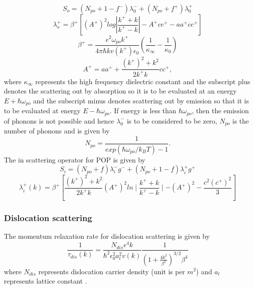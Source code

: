 \documentclass[12pt]{article}
\begin{document}
\begin{equation}
S_{o} = ( N_{po} + 1 - \textit{f}^- ) \lambda^{-}_0 + ( N_{po} + \textit{f}^+) \lambda^{+}_0 
\label{So}
\end{equation}
\begin{equation}
\lambda^+_{o} = \beta^+[(A^+)^2 log \left| \frac{k^+ + k}{k^+ - k}\right| - A^+ c c^+ - aa^+cc^+] 
\label{lambda0}
\end{equation}
\begin{equation}
\beta^+ = \frac{e^2 \omega_{po} k^+ }{4 \pi \hbar k v(k^+) \epsilon_0 } \left(\frac{1}{\kappa_\infty} - \frac{1}{\kappa_0}\right)
\label{betaaaa}
\end{equation}
\begin{equation}
A^+ = aa^+ + \frac{(k^+)^2 + k^2}{2 k^+ k} cc^+,
\label{Apositive}
\end{equation}
where $\kappa_\infty$ represents the high frequency dielectric constant and the subscript plus denotes the scattering out by absorption so it is to be evaluated at an energy $E + \hbar \omega_{po} $ and the subscript minus denotes scattering out by emission so that it is to be evaluated at energy  $E - \hbar \omega_{po} $. If energy is less than $ \hbar \omega_{po} $, then the emission of phonons is not possible and hence $\lambda^{-}_0$ is to be considered to be zero, 
$N_{po} $ is the number of phonons and is given by 
\begin{equation}
N_{po} = \frac{1}{exp(\hbar \omega_{po}/k_B T)-1} .
\label{Npo}
\end{equation}
The in scattering operator for POP is given by \cite{rode1}
\begin{equation}
S_{i} = ( N_{po} + \textit{f} ) \lambda^{-}_i g^- + ( N_{po} + 1 - \textit{f}) \lambda^{+}_i g^+ 
\label{Si}
\end{equation}
\begin{equation}
\lambda^+_{i}(k) = \beta^+ [\frac{(k^+)^2+k^2}{2k^+k}(A^+)^2 ln\mid \frac{k^+ + k}{k^+ - k}\mid - (A^+)^2 - \frac{c^2 (c^+)^2}{3}]
\label{lambdai}
\end{equation}

\subsubsection{Dislocation scattering}
The momentum relaxation rate for dislocation scattering is given by \cite{miller}
\begin{equation}
\frac{1}{\tau_{dis}(k)} = \frac{N_{dis}e^4k}{\hbar^2 \epsilon_0^2 a_l^2v(k)} \frac{1}{(1+\frac{4k^2}{\beta^2})^{3/2}\beta^4}
\label{dislocation}
\end{equation}
where $N_{dis}$ represents dislocation carrier density (unit is per $m^2$) and $a_l$ represents lattice constant .
\end{document}
